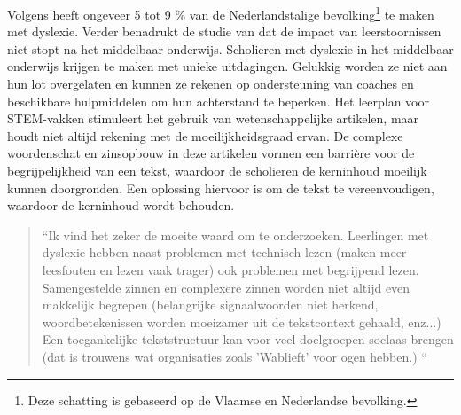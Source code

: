
Volgens \textcite{Ghesquiere2018} heeft ongeveer 5 tot 9 \% van de Nederlandstalige bevolking\footnote{Deze schatting is gebaseerd op de Vlaamse en Nederlandse bevolking.} te maken met dyslexie. Verder benadrukt de studie van \textcite{Lissens2020} dat de impact van leerstoornissen niet stopt na het middelbaar onderwijs. Scholieren met dyslexie in het middelbaar onderwijs krijgen te maken met unieke uitdagingen. Gelukkig worden ze niet aan hun lot overgelaten en kunnen ze rekenen op ondersteuning van coaches en beschikbare hulpmiddelen om hun achterstand te beperken. Het leerplan voor STEM-vakken stimuleert het gebruik van wetenschappelijke artikelen, maar houdt niet altijd rekening met de moeilijkheidsgraad ervan. De complexe woordenschat en zinsopbouw in deze artikelen vormen een barrière voor de begrijpelijkheid van een tekst, waardoor de scholieren de kerninhoud moeilijk kunnen doorgronden. Een oplossing hiervoor is om de tekst te vereenvoudigen, waardoor de kerninhoud wordt behouden.





\newline

\begin{quote}
	“Ik vind het zeker de moeite waard om te onderzoeken. Leerlingen met dyslexie hebben naast problemen met technisch lezen (maken meer leesfouten en lezen vaak trager) ook problemen met begrijpend lezen. Samengestelde zinnen en complexere zinnen worden niet altijd even makkelijk begrepen (belangrijke signaalwoorden niet herkend, woordbetekenissen worden moeizamer uit de tekstcontext gehaald, enz...) Een toegankelijke tekststructuur kan voor veel doelgroepen soelaas brengen (dat is trouwens wat organisaties zoals 'Wablieft' voor ogen hebben.) “
\end{quote}

